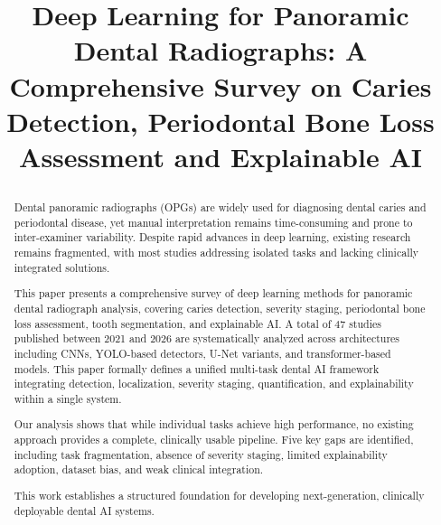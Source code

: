 \documentclass[conference]{IEEEtran}
\begin{document}
\title{Deep Learning for Panoramic Dental Radiographs: A Comprehensive
Survey on Caries Detection, Periodontal Bone Loss Assessment and
Explainable AI%

}

\author{
\and
{}
\and
{}
\and
{}
\and
{}
}
\maketitle

\begin{abstract}
Dental panoramic radiographs (OPGs) are widely used for diagnosing
dental caries and periodontal disease, yet manual interpretation remains
time-consuming and prone to inter-examiner variability. Despite rapid
advances in deep learning, existing research remains fragmented, with
most studies addressing isolated tasks and lacking clinically integrated
solutions.

This paper presents a comprehensive survey of deep learning methods for
panoramic dental radiograph analysis, covering caries detection, severity
staging, periodontal bone loss assessment, tooth segmentation, and
explainable AI. A total of 47 studies published between 2021 and 2026
are systematically analyzed across architectures including CNNs,
YOLO-based detectors, U-Net variants, and transformer-based models. This
paper formally defines a unified multi-task dental AI framework
integrating detection, localization, severity staging, quantification,
and explainability within a single system.

Our analysis shows that while individual tasks achieve high performance,
no existing approach provides a complete, clinically usable pipeline.
Five key gaps are identified, including task fragmentation, absence of
severity staging, limited explainability adoption, dataset bias, and
weak clinical integration.

This work establishes a structured foundation for developing
next-generation, clinically deployable dental AI systems.
\end{abstract}
\end{document}
